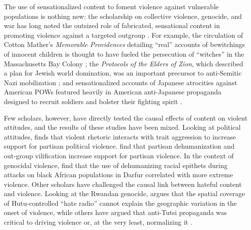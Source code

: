 The use of sensationalized content to foment violence against vulnerable populations is nothing new: the scholarship on collective violence, genocide, and war has long noted the outsized role of fabricated, sensational content in promoting violence against a targeted outgroup \citep{charny2019can, cohn1967warrant, dower1986war, fein1979accounting, herf2006jewish, hill1995delusion, goldhagen1997hitler, goldhagen2009worse, tsesis2002destructive}. For example, the circulation of Cotton Mather's \textit{Memorable Providences} detailing ``real'' accounts of bewitchings of innocent children is thought to have fueled the persecution of ``witches'' in the Massachusetts Bay Colony \citep{hill1995delusion}; the \textit{Protocols of the Elders of Zion}, which described a plan for Jewish world domination, was an important precursor to anti-Semitic Nazi mobilization \citep{cohn1967warrant,herf2006jewish}; and sensationalized accounts of Japanese atrocities against American POWs featured heavily in American anti-Japanese propaganda designed to recruit soldiers and bolster their fighting spirit \citep{dower1986war}. 

Few scholars, however, have directly tested the causal effects of content on violent attitudes, and the results of these studies have been mixed. Looking at political attitudes, \cite{kalmoe2014fueling} finds that violent rhetoric interacts with trait aggression to increase support for partisan political violence. \cite{kalmoe2022radical} find that partisan dehumanization and out-group vilification increase support for partisan violence. In the context of genocidal violence, \cite{hagan2008darfur} find that the use of dehumanizing racial epithets during attacks on black African populations in Darfur correlated with more extreme violence. Other scholars have challenged the causal link between hateful content and violence. Looking at the Rwandan genocide, \cite{straus2007relationship} argues that the spatial coverage of Hutu-controlled ``hate radio'' cannot explain the geographic variation in the onset of violence, while others have argued that anti-Tutsi propaganda was critical to driving violence or, at the very least, normalizing it \citep{fujii2004transforming, yanagizawa2014propaganda}.

